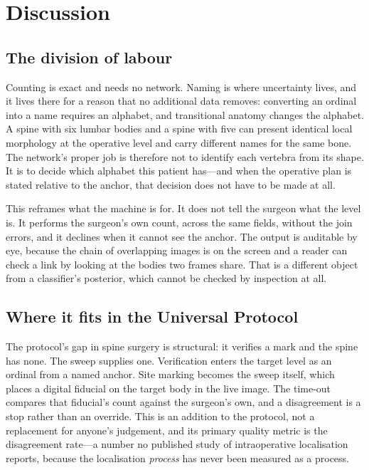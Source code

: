 \documentclass[11pt,letterpaper]{article}
\begin{document}
\section*{Discussion}

\subsection*{The division of labour}
Counting is exact and needs no network. Naming is where uncertainty lives, and it lives there for a reason
that no additional data removes: converting an ordinal into a name requires an alphabet, and transitional
anatomy changes the alphabet. A spine with six lumbar bodies and a spine with five can present identical
local morphology at the operative level and carry different names for the same bone. The network's proper
job is therefore not to identify each vertebra from its shape. It is to decide which alphabet this patient
has---and when the operative plan is stated relative to the anchor, that decision does not have to be made
at all.

This reframes what the machine is for. It does not tell the surgeon what the level is. It performs the
surgeon's own count, across the same fields, without the join errors, and it declines when it cannot see
the anchor. The output is auditable by eye, because the chain of overlapping images is on the screen and a
reader can check a link by looking at the bodies two frames share. That is a different object from a
classifier's posterior, which cannot be checked by inspection at all.

\subsection*{Where it fits in the Universal Protocol}
The protocol's gap in spine surgery is structural: it verifies a mark and the spine has none. The sweep
supplies one. Verification enters the target level as an ordinal from a named anchor. Site marking becomes
the sweep itself, which places a digital fiducial on the target body in the live image. The time-out
compares that fiducial's count against the surgeon's own, and a disagreement is a stop rather than an
override. This is an addition to the protocol, not a replacement for anyone's judgement, and its primary
quality metric is the disagreement rate---a number no published study of intraoperative localisation
reports, because the localisation \emph{process} has never been measured as a process.
\end{document}
